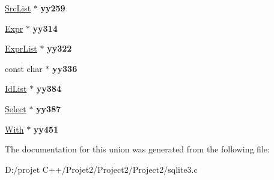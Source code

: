 \begin{DoxyCompactItemize}
\begin{tabbing}
\end{tabbing}\item 
\mbox{\label{union_y_y_m_i_n_o_r_t_y_p_e_aecb1e4bcc603cf3e508d3d848391e5d7}} 
\mbox{\hyperlink{struct_src_list}{Src\+List}} $\ast$ {\bfseries yy259}
\item 
\mbox{\label{union_y_y_m_i_n_o_r_t_y_p_e_aef6a1397e9c0b55950de3858fc06d38f}} 
\mbox{\hyperlink{struct_expr}{Expr}} $\ast$ {\bfseries yy314}
\item 
\mbox{\label{union_y_y_m_i_n_o_r_t_y_p_e_ad1634e35fc2640914050fb35a2b02f5c}} 
\mbox{\hyperlink{struct_expr_list}{Expr\+List}} $\ast$ {\bfseries yy322}
\item 
\mbox{\label{union_y_y_m_i_n_o_r_t_y_p_e_a6d4d06ff255cf5fc453e00d2cf441a3a}} 
const char $\ast$ {\bfseries yy336}
\item 
\mbox{\label{union_y_y_m_i_n_o_r_t_y_p_e_a94e46061fe74047ba6d245e6dfcf6434}} 
\mbox{\hyperlink{struct_id_list}{Id\+List}} $\ast$ {\bfseries yy384}
\item 
\mbox{\label{union_y_y_m_i_n_o_r_t_y_p_e_af85eeecd20fb319ac8f5ec9701bce614}} 
\mbox{\hyperlink{struct_select}{Select}} $\ast$ {\bfseries yy387}
\item 
\mbox{\label{union_y_y_m_i_n_o_r_t_y_p_e_a3f52cbe1a1e78d8cd5212f81052c7106}} 
\mbox{\hyperlink{struct_with}{With}} $\ast$ {\bfseries yy451}
\end{DoxyCompactItemize}


The documentation for this union was generated from the following file\+:\begin{DoxyCompactItemize}
\item 
D\+:/projet C++/\+Projet2/\+Project2/\+Project2/sqlite3.\+c\end{DoxyCompactItemize}
